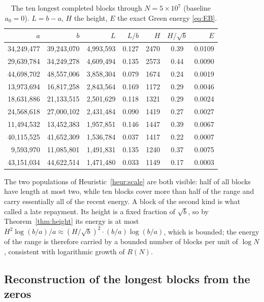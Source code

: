 \documentclass[11pt]{article}
\theoremstyle{definition}
\theoremstyle{remark}
\begin{document}
\begin{table}[ht]
\centering
\caption{The ten longest completed blocks through $N=5\times10^7$ (baseline $a_0=0$). $L=b-a$, $H$ the height, $E$ the exact Green energy \eqref{eq:EB}.}
\label{tab:longest}
\begin{tabular}{rrrrrcr}
\toprule
$a$ & $b$ & $L$ & $L/b$ & $H$ & $H/\sqrt b$ & $E$\\
\midrule
34{,}249{,}477 & 39{,}243{,}070 & 4{,}993{,}593 & 0.127 & 2470 & 0.39 & 0.0109\\
29{,}639{,}784 & 34{,}249{,}278 & 4{,}609{,}494 & 0.135 & 2573 & 0.44 & 0.0090\\
44{,}698{,}702 & 48{,}557{,}006 & 3{,}858{,}304 & 0.079 & 1674 & 0.24 & 0.0019\\
13{,}973{,}694 & 16{,}817{,}258 & 2{,}843{,}564 & 0.169 & 1172 & 0.29 & 0.0046\\
18{,}631{,}886 & 21{,}133{,}515 & 2{,}501{,}629 & 0.118 & 1321 & 0.29 & 0.0024\\
24{,}568{,}618 & 27{,}000{,}102 & 2{,}431{,}484 & 0.090 & 1419 & 0.27 & 0.0027\\
11{,}494{,}532 & 13{,}452{,}383 & 1{,}957{,}851 & 0.146 & 1447 & 0.39 & 0.0067\\
40{,}115{,}525 & 41{,}652{,}309 & 1{,}536{,}784 & 0.037 & 1417 & 0.22 & 0.0007\\
9{,}593{,}970 & 11{,}085{,}801 & 1{,}491{,}831 & 0.135 & 1240 & 0.37 & 0.0075\\
43{,}151{,}034 & 44{,}622{,}514 & 1{,}471{,}480 & 0.033 & 1149 & 0.17 & 0.0003\\
\bottomrule
\end{tabular}
\end{table}

The two populations of Heuristic~\ref{heur:scale} are both visible: half of all blocks have length at most two, while ten blocks cover more than half of the range and carry essentially all of the recent energy. A block of the second kind is what \cite{michaels-colors} called a late repayment. Its height is a fixed fraction of $\sqrt b$, so by Theorem~\ref{thm:height} its energy is at most $H^2\log(b/a)/a\approx(H/\sqrt b)^2\cdot(b/a)\log(b/a)$, which is bounded; the energy of the range is therefore carried by a bounded number of blocks per unit of $\log N$, consistent with logarithmic growth of $R(N)$.

\subsection{Reconstruction of the longest blocks from the zeros}
\end{document}
